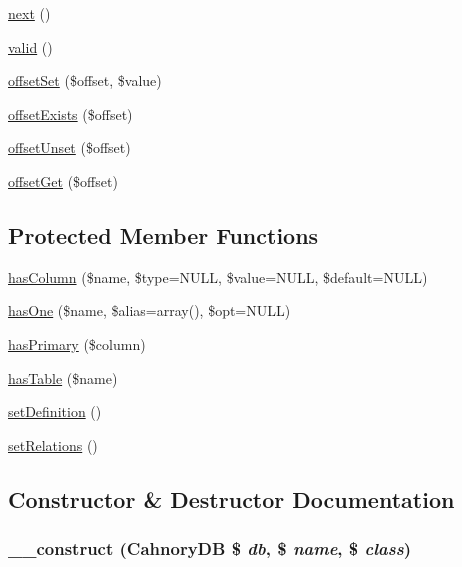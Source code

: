 \begin{CompactItemize}
\item 
\hyperlink{class_cahnory_d_b___record_cea62048bfee7b3cd80ed446c86fb78a}{next} ()
\item 
\hyperlink{class_cahnory_d_b___record_bb9f0d6adf1eb9b3b55712056861a247}{valid} ()
\item 
\hyperlink{class_cahnory_d_b___record_c6bde6b1eb50eb5377e91771fe46b7a3}{offsetSet} (\$offset, \$value)
\item 
\hyperlink{class_cahnory_d_b___record_24ff257ec0c2221bc6fd7b1b4388e26e}{offsetExists} (\$offset)
\item 
\hyperlink{class_cahnory_d_b___record_2411227ea7118b13495de9839fd4b563}{offsetUnset} (\$offset)
\item 
\hyperlink{class_cahnory_d_b___record_59aee6e89465b48f014699f41b521f87}{offsetGet} (\$offset)
\end{CompactItemize}
\subsection*{Protected Member Functions}
\begin{CompactItemize}
\item 
\hyperlink{class_cahnory_d_b___record_01fd43fd23f987cc60b16b738500f761}{hasColumn} (\$name, \$type=NULL, \$value=NULL, \$default=NULL)
\item 
\hyperlink{class_cahnory_d_b___record_4e3bc39c17d522ad92115b6f468e0e0d}{hasOne} (\$name, \$alias=array(), \$opt=NULL)
\item 
\hyperlink{class_cahnory_d_b___record_4361756ffa4efc1520773351e302e00e}{hasPrimary} (\$column)
\item 
\hyperlink{class_cahnory_d_b___record_ca9bac350ad668703ba2890e0881d4fc}{hasTable} (\$name)
\item 
\hyperlink{class_cahnory_d_b___record_d69acdbce085490afa51ff1a22393f69}{setDefinition} ()
\item 
\hyperlink{class_cahnory_d_b___record_af15e0a8dba4e019537783e0d2177479}{setRelations} ()
\end{CompactItemize}


\subsection{Constructor \& Destructor Documentation}
\hypertarget{class_cahnory_d_b___record_c28688e5850a284aaa96a469ee21424e}{
\subsubsection[{\_\-\_\-construct}]{\setlength{\rightskip}{0pt plus 5cm}\_\-\_\-construct (CahnoryDB \$ {\em db}, \/  \$ {\em name}, \/  \$ {\em class})}}
\label{class_cahnory_d_b___record_c28688e5850a284aaa96a469ee21424e}




